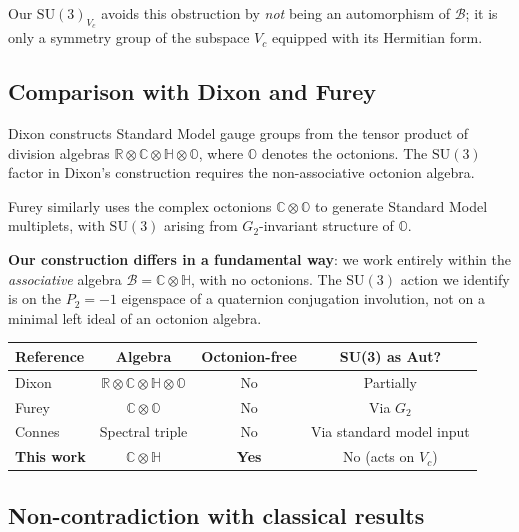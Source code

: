 Our $\mathrm{SU}(3)_{V_c}$ avoids this obstruction by \emph{not} being an
automorphism of $\mathcal{B}$; it is only a symmetry group of the subspace
$V_c$ equipped with its Hermitian form.

\subsection{Comparison with Dixon and Furey}

Dixon \cite{Dixon1994} constructs Standard Model gauge groups from the tensor
product of division algebras $\mathbb{R}\otimes\mathbb{C}\otimes\mathbb{H}
\otimes\mathbb{O}$, where $\mathbb{O}$ denotes the octonions.  The
$\mathrm{SU}(3)$ factor in Dixon's construction requires the non-associative
octonion algebra.

Furey \cite{Furey2016} similarly uses the complex octonions $\mathbb{C}
\otimes\mathbb{O}$ to generate Standard Model multiplets, with $\mathrm{SU}(3)$
arising from $G_2$-invariant structure of $\mathbb{O}$.

\textbf{Our construction differs in a fundamental way}: we work entirely within
the \emph{associative} algebra $\mathcal{B}=\mathbb{C}\otimes\mathbb{H}$, with
no octonions.  The $\mathrm{SU}(3)$ action we identify is on the $P_2=-1$
eigenspace of a quaternion conjugation involution, not on a minimal left ideal
of an octonion algebra.

\medskip
\begin{center}
\begin{tabular}{lccc}
  \hline
  Reference & Algebra & Octonion-free & SU(3) as Aut? \\
  \hline
  Dixon \cite{Dixon1994} & $\mathbb{R}\otimes\mathbb{C}\otimes\mathbb{H}\otimes\mathbb{O}$ & No & Partially \\
  Furey \cite{Furey2016} & $\mathbb{C}\otimes\mathbb{O}$ & No & Via $G_2$ \\
  Connes \cite{Connes1994} & Spectral triple & No & Via standard model input \\
  \textbf{This work} & $\mathbb{C}\otimes\mathbb{H}$ & \textbf{Yes} & No (acts on $V_c$) \\
  \hline
\end{tabular}
\end{center}

\subsection{Non-contradiction with classical results}

